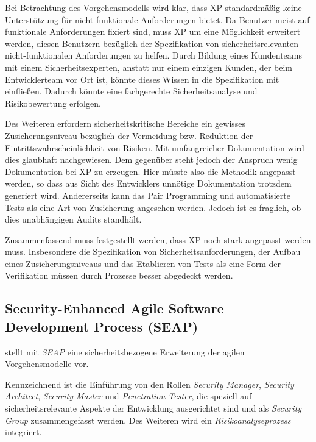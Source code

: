 Bei Betrachtung des Vorgehensmodells wird klar, dass XP standardmäßig keine Unterstützung für nicht-funktionale Anforderungen bietet.
Da Benutzer meist auf funktionale Anforderungen fixiert sind, muss XP um eine Möglichkeit erweitert werden, diesen Benutzern bezüglich der Spezifikation von sicherheitsrelevanten nicht-funktionalen Anforderungen zu helfen.
Durch Bildung eines Kundenteams mit einem Sicherheitsexperten, anstatt nur einem einzigen Kunden, der beim Entwicklerteam vor Ort ist, könnte dieses Wissen in die Spezifikation mit einfließen.
Dadurch könnte eine fachgerechte Sicherheitsanalyse und Risikobewertung erfolgen.
\parencite[Vgl.][S. 8 - 11]{Wayrynen:2004aa}

Des Weiteren erfordern sicherheitskritische Bereiche ein gewisses Zusicherungsniveau bezüglich der Vermeidung bzw. Reduktion der Eintrittswahrscheinlichkeit von Risiken.
Mit umfangreicher Dokumentation wird dies glaubhaft nachgewiesen.
Dem gegenüber steht jedoch der Anspruch wenig Dokumentation bei XP zu erzeugen.
Hier müsste also die Methodik angepasst werden, so dass aus Sicht des Entwicklers unnötige Dokumentation trotzdem generiert wird.
Andererseits kann das Pair Programming und automatisierte Tests als eine Art von Zusicherung angesehen werden.
Jedoch ist es fraglich, ob dies unabhängigen Audits standhält.
\parencite[Vgl.][S. 8 f.]{Wayrynen:2004aa}

Zusammenfassend muss festgestellt werden, dass XP noch stark angepasst werden muss.
Insbesondere die Spezifikation von Sicherheitsanforderungen, der Aufbau eines Zusicherungsniveaus und das Etablieren von Tests als eine Form der Verifikation müssen durch Prozesse besser abgedeckt werden.

\subsection{Security-Enhanced Agile Software Development Process (SEAP)} \label{sec:seap}

\parencite[][]{Baca:2015aa} stellt mit \emph{SEAP} eine sicherheitsbezogene Erweiterung der agilen Vorgehensmodelle vor.

Kennzeichnend ist die Einführung von den Rollen \emph{Security Manager}, \emph{Security Architect}, \emph{Security Master} und \emph{Penetration Tester}, die speziell auf sicherheitsrelevante Aspekte der Entwicklung ausgerichtet sind und als \emph{Security Group} zusammengefasst werden.
Des Weiteren wird ein \emph{Risikoanalyseprozess} integriert.
\parencite[Vgl.][S. 14]{Baca:2015aa}

